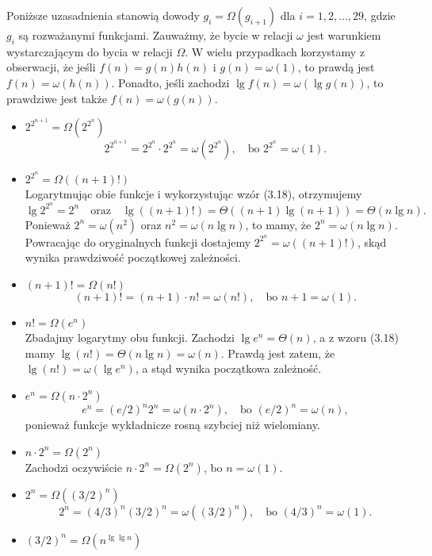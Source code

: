 \subsubsection{} %
Poniższe uzasadnienia stanowią dowody $g_i=\Omega(g_{i+1})$ dla $i=1,2,\dots,29$, gdzie $g_i$ są rozważanymi funkcjami. Zauważmy, że bycie w relacji $\omega$ jest warunkiem wystarczającym do bycia w relacji $\Omega$. W wielu przypadkach korzystamy z obserwacji, że jeśli $f(n)=g(n)h(n)$ i $g(n)=\omega(1)$, to prawdą jest $f(n)=\omega(h(n))$. Ponadto, jeśli zachodzi $\lg f(n)=\omega(\lg g(n))$, to prawdziwe jest także $f(n)=\omega(g(n))$.
\begin{itemize}
\item $2^{2^{n+1}}=\Omega\left(2^{2^n}\right)$ \\
	\[
		2^{2^{n+1}} = 2^{2^n}\cdot 2^{2^n} = \omega\left(2^{2^n}\right),\quad\mbox{bo }2^{2^n}=\omega(1).
	\]
\item $2^{2^n}=\Omega((n+1)!)$ \\
	Logarytmując obie funkcje i wykorzystując wzór (3.18), otrzymujemy
	\[
		\lg 2^{2^n}=2^n\quad\mbox{oraz}\quad\lg((n+1)!) = \Theta((n+1)\lg(n+1)) = \Theta(n\lg n).
	\]
	Ponieważ $2^n=\omega(n^2)$ oraz $n^2=\omega(n\lg n)$, to mamy, że $2^n=\omega(n\lg n)$. Powracając do oryginalnych funkcji dostajemy $2^{2^n}=\omega((n+1)!)$, skąd wynika prawdziwość początkowej zależności.
\item $(n+1)!=\Omega(n!)$
	\[
		(n+1)! = (n+1)\cdot n! = \omega(n!),\quad\mbox{bo }n+1=\omega(1).
	\]
\item $n!=\Omega(e^n)$ \\
	Zbadajmy logarytmy obu funkcji.	Zachodzi $\lg e^n=\Theta(n)$, a z wzoru (3.18) mamy $\lg(n!)=\Theta(n\lg n)=\omega(n)$. Prawdą jest zatem, że $\lg(n!)=\omega(\lg e^n)$, a stąd wynika początkowa zależność.
\item $e^n=\Omega(n\cdot 2^n)$ \\
	\[
		e^n = (e/2)^n2^n = \omega(n\cdot 2^n),\quad\mbox{bo }(e/2)^n=\omega(n),
	\]
	ponieważ funkcje wykładnicze rosną szybciej niż wielomiany.
\item $n\cdot 2^n=\Omega(2^n)$ \\
	Zachodzi oczywiście $n\cdot 2^n=\Omega(2^n)$, bo $n=\omega(1)$.
\item $2^n=\Omega((3/2)^n)$ \\
	\[
		2^n = (4/3)^n(3/2)^n = \omega((3/2)^n),\quad\mbox{bo }(4/3)^n=\omega(1).
	\]
\item $(3/2)^n=\Omega\left(n^{\lg\lg n}\right)$ \\

\end{itemize}
